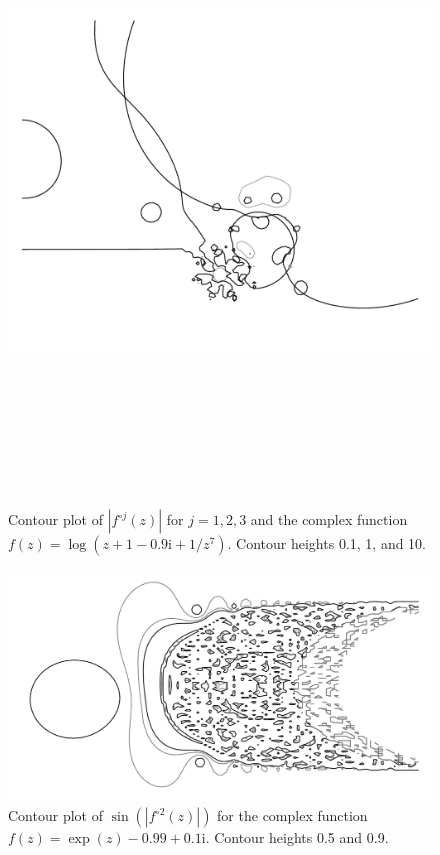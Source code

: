 \documentclass[12pt, a4paper]{amsart}
\newcommand{\mi}{\text{i}}  %
\begin{document}
\begin{figure}[!ht]
\includegraphics[width=160mm, height=170mm]{three_monkeys_eaten.pdf}
\caption{
Contour plot of $|f^{\circ j}(z)|$ for $j = 1, 2, 3$ and the complex function $f(z) = \log(z + 1 -0.9\mi + 1/z^7)$.
Contour heights 0.1, 1, and 10.
}
\end{figure}
\pagebreak
\begin{figure}[!ht] 
\includegraphics[width=230mm, angle=-90]{mr_fancy_pants.pdf}
\caption{
Contour plot of $\sin(|f^{\circ 2}(z)|)$ for the complex function $f(z) = \exp(z) - 0.99 + 0.1\mi$.
Contour heights 0.5 and 0.9.
}
\end{figure}
\end{document}
